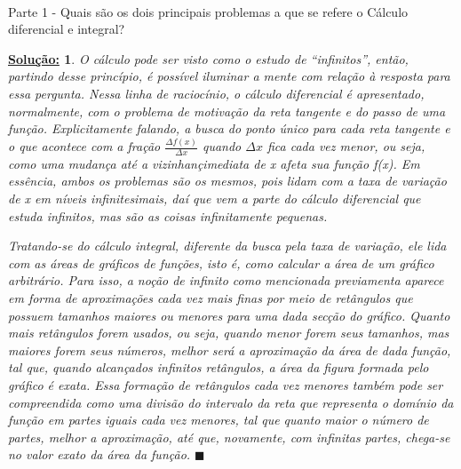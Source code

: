 \documentclass{article}
\newtheorem*{sol*}{\underline{Solu\c c\~ao:}}
\renewcommand\qedsymbol{$\blacksquare$}
\begin{document}
\paragraph{} Parte 1 - Quais s\~ao os dois principais problemas a que se refere o C\'alculo diferencial e integral?
\begin{sol*}
	O c\'alculo pode ser visto como o estudo de ``infinitos'', ent\~ao, partindo desse princ\'ipio, \'e poss\'ivel iluminar a mente com rela\c c\~ao \`a resposta para essa pergunta. Nessa linha de racioc\'inio, o c\'alculo diferencial \'e apresentado, normalmente, com o problema de motiva\c c\~ao da reta tangente e do passo de uma fun\c c\~ao. Explicitamente falando, a busca do ponto \'unico para cada reta tangente e o que acontece com a fra\c c\~ao $\frac{\Delta{f(x)}}{\Delta{x}}$ quando $\Delta{x}$ fica cada vez menor, ou seja, como uma mudan\c ca at\'e a vizinhan\c c\a imediata de x afeta sua fun\c c\~ao f(x). Em ess\^encia, ambos os problemas s\~ao os mesmos, pois lidam com a taxa de varia\c c\~ao de x em n\'iveis infinitesimais, da\'i que vem a parte do c\'alculo diferencial que estuda infinitos, mas s\~ao as coisas infinitamente pequenas.

	Tratando-se do c\'alculo integral, diferente da busca pela taxa de varia\c c\~ao, ele lida com as \'areas de gr\'aficos de fun\c c\~oes, isto \'e, como calcular a \'area de um gr\'afico arbitr\'ario. Para isso, a no\c c\~ao de infinito como mencionada previamenta aparece em forma de aproxima\c c\~oes cada vez mais finas por meio de ret\^angulos que possuem tamanhos maiores ou menores para uma dada sec\c c\~ao do gr\'afico. Quanto mais ret\^angulos forem usados, ou seja, quando menor forem seus tamanhos, mas maiores forem seus n\'umeros, melhor ser\'a a aproxima\c c\~ao da \'area de dada fun\c c\~ao, tal que, quando alcan\c cados infinitos ret\^angulos, a \'area da figura formada pelo gr\'afico \'e exata. Essa forma\c c\~ao de ret\^angulos cada vez menores tamb\'em pode ser compreendida como uma divis\~ao do intervalo da reta que representa o dom\'inio da fun\c c\~ao em partes iguais cada vez menores, tal que quanto maior o n\'umero de partes, melhor a aproxima\c c\~ao, at\'e que, novamente, com infinitas partes, chega-se no valor exato da \'area da fun\c c\~ao.
	\qedsymbol
\end{sol*}
\end{document}
